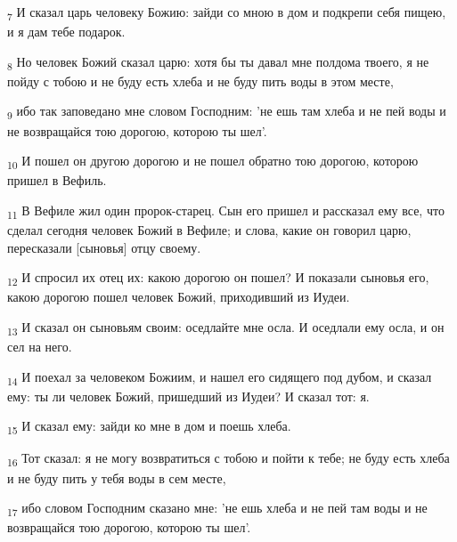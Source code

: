 \begin{tcolorbox}
\textsubscript{7} И сказал царь человеку Божию: зайди со мною в дом и подкрепи себя пищею, и я дам тебе подарок.
\end{tcolorbox}
\begin{tcolorbox}
\textsubscript{8} Но человек Божий сказал царю: хотя бы ты давал мне полдома твоего, я не пойду с тобою и не буду есть хлеба и не буду пить воды в этом месте,
\end{tcolorbox}
\begin{tcolorbox}
\textsubscript{9} ибо так заповедано мне словом Господним: 'не ешь там хлеба и не пей воды и не возвращайся тою дорогою, которою ты шел'.
\end{tcolorbox}
\begin{tcolorbox}
\textsubscript{10} И пошел он другою дорогою и не пошел обратно тою дорогою, которою пришел в Вефиль.
\end{tcolorbox}
\begin{tcolorbox}
\textsubscript{11} В Вефиле жил один пророк-старец. Сын его пришел и рассказал ему все, что сделал сегодня человек Божий в Вефиле; и слова, какие он говорил царю, пересказали [сыновья] отцу своему.
\end{tcolorbox}
\begin{tcolorbox}
\textsubscript{12} И спросил их отец их: какою дорогою он пошел? И показали сыновья его, какою дорогою пошел человек Божий, приходивший из Иудеи.
\end{tcolorbox}
\begin{tcolorbox}
\textsubscript{13} И сказал он сыновьям своим: оседлайте мне осла. И оседлали ему осла, и он сел на него.
\end{tcolorbox}
\begin{tcolorbox}
\textsubscript{14} И поехал за человеком Божиим, и нашел его сидящего под дубом, и сказал ему: ты ли человек Божий, пришедший из Иудеи? И сказал тот: я.
\end{tcolorbox}
\begin{tcolorbox}
\textsubscript{15} И сказал ему: зайди ко мне в дом и поешь хлеба.
\end{tcolorbox}
\begin{tcolorbox}
\textsubscript{16} Тот сказал: я не могу возвратиться с тобою и пойти к тебе; не буду есть хлеба и не буду пить у тебя воды в сем месте,
\end{tcolorbox}
\begin{tcolorbox}
\textsubscript{17} ибо словом Господним сказано мне: 'не ешь хлеба и не пей там воды и не возвращайся тою дорогою, которою ты шел'.
\end{tcolorbox}
